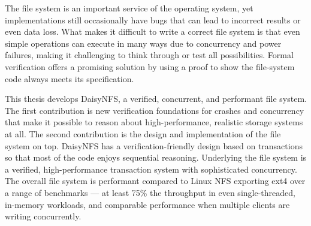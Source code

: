The file system is an important service of the operating system, yet
implementations still occasionally have bugs that can lead to incorrect results
or even data loss. What makes it difficult to write a correct file system is
that even simple operations can execute in many ways due to concurrency and
power failures, making it challenging to think through or test all
possibilities. Formal verification offers a promising solution by using a proof
to show the file-system code always meets its specification.

This thesis develops DaisyNFS, a verified, concurrent, and performant file
system. The first contribution is new verification foundations for crashes and
concurrency that make it possible to reason about high-performance, realistic storage
systems at all. The second contribution is the design and implementation of the
file system on top. DaisyNFS has a verification-friendly design based on
transactions so that most of
the code enjoys sequential reasoning. Underlying the file system is a
verified, high-performance transaction system with sophisticated concurrency.
The overall file system is performant compared to Linux NFS exporting ext4 over
a range of benchmarks --- at least 75\% the throughput in even single-threaded,
in-memory workloads, and comparable performance when multiple clients are
writing concurrently.
